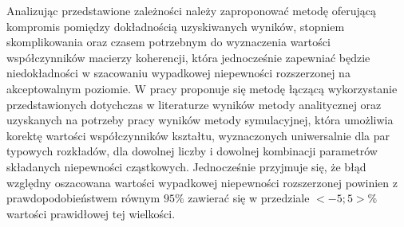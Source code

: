 Analizując przedstawione zależności należy zaproponować metodę oferującą kompromis pomiędzy dokładnością uzyskiwanych wyników, stopniem skomplikowania oraz czasem potrzebnym do wyznaczenia wartości współczynników macierzy koherencji, która jednocześnie zapewniać będzie niedokładności w szacowaniu wypadkowej niepewności rozszerzonej na akceptowalnym poziomie. W pracy proponuje się metodę łączącą wykorzystanie przedstawionych dotychczas w literaturze wyników metody analitycznej oraz uzyskanych na potrzeby pracy wyników metody symulacyjnej, która umożliwia korektę wartości współczynników kształtu, wyznaczonych uniwersalnie dla par typowych rozkładów, dla dowolnej liczby i dowolnej kombinacji parametrów składanych niepewności cząstkowych. Jednocześnie przyjmuje się, że błąd względny oszacowana wartości wypadkowej niepewności rozszerzonej powinien z prawdopodobieństwem równym $95\%$ zawierać się w przedziale $<-5;5> \%$ wartości prawidłowej tej wielkości.

